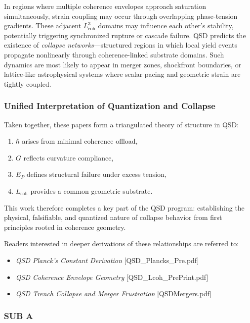 \documentclass[entropy,article,submit,pdftex,moreauthors]{Definitions/mdpi}
\begin{document}
In regions where multiple coherence envelopes approach saturation simultaneously, strain coupling may occur through overlapping phase-tension gradients. These adjacent $L_{\text{coh}}^3$ domains may influence each other's stability, potentially triggering synchronized rupture or cascade failure. QSD predicts the existence of \textit{collapse networks}—structured regions in which local yield events propagate nonlinearly through coherence-linked substrate domains. Such dynamics are most likely to appear in merger zones, shockfront boundaries, or lattice-like astrophysical systems where scalar pacing and geometric strain are tightly coupled.


\subsubsection{Unified Interpretation of Quantization and Collapse}
Taken together, these papers form a triangulated theory of structure in QSD:
\begin{enumerate}
  \item $\hbar$ arises from minimal coherence offload,
  \item $G$ reflects curvature compliance,
  \item $E_P$ defines structural failure under excess tension,
  \item $L_{\text{coh}}$ provides a common geometric substrate.
\end{enumerate}

This work therefore completes a key part of the QSD program: establishing the physical, falsifiable, and quantized nature of collapse behavior from first principles rooted in coherence geometry.

Readers interested in deeper derivations of these relationships are referred to:
\begin{itemize}
  \item \textit{QSD Planck’s Constant Derivation} [QSD\_Plancks\_Pre.pdf]
  \item \textit{QSD Coherence Envelope Geometry} [QSD\_Lcoh\_PrePrint.pdf]
  \item \textit{QSD Trench Collapse and Merger Frustration} [QSDMergers.pdf]
\end{itemize}


\subsubsection{SUB A}
\end{document}
